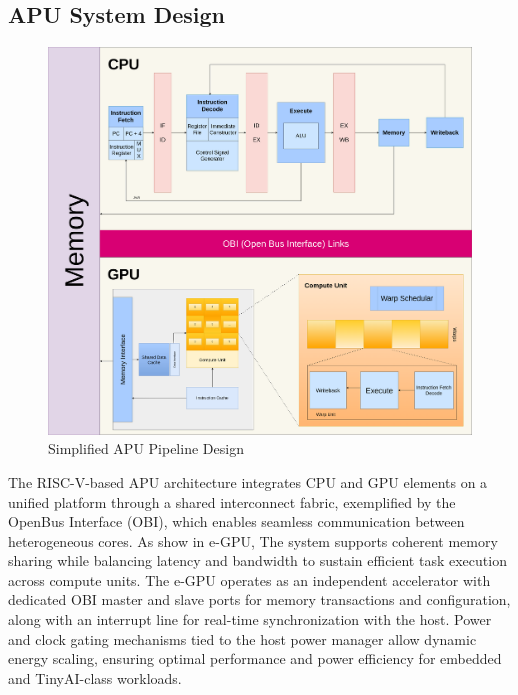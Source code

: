 \documentclass[a4paper,twoside]{article}
\begin{document}
\subsection{APU System Design}

\begin{figure}[h]
        \centering
        \includegraphics[width=1\textwidth]{../../pipeline_design.png}
        \caption{Simplified APU Pipeline Design}
        \label{fig.example}
\end{figure}

The RISC-V-based APU architecture integrates CPU and GPU elements on a unified platform through a shared interconnect fabric, exemplified by the OpenBus Interface (OBI), which enables seamless communication between heterogeneous cores. As show in e-GPU, The system supports coherent memory sharing while balancing latency and bandwidth to sustain efficient task execution across compute units. The e-GPU operates as an independent accelerator with dedicated OBI master and slave ports for memory transactions and configuration, along with an interrupt line for real-time synchronization with the host. Power and clock gating mechanisms tied to the host power manager allow dynamic energy scaling, ensuring optimal performance and power efficiency for embedded and TinyAI-class workloads.
\end{document}

